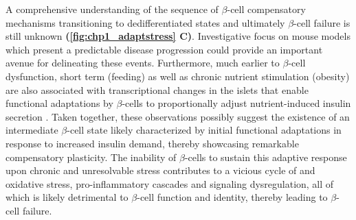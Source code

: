 A comprehensive understanding of the sequence of $\beta$-cell compensatory mechanisms transitioning to dedifferentiated states and ultimately $\beta$-cell failure is still unknown \textbf{(\autoref{fig:chp1_adaptstress} C)}. Investigative focus on mouse models which present a predictable disease progression could provide an important avenue for delineating these events. %
Furthermore, much earlier to $\beta$-cell dysfunction, short term (feeding) as well as chronic nutrient stimulation (obesity) are also associated with transcriptional changes in the islets that enable functional adaptations by $\beta$-cells to proportionally adjust nutrient-induced insulin secretion \textbf{\cite{wortham_nutrient_2023}}. Taken together, these observations possibly suggest the existence of an intermediate $\beta$-cell state likely characterized by initial functional adaptations in response to increased insulin demand, thereby showcasing remarkable compensatory plasticity. The inability of $\beta$-cells to sustain this adaptive response upon chronic and unresolvable stress contributes to a vicious cycle of  and oxidative stress, pro-inflammatory cascades and signaling dysregulation, all of which is likely detrimental to $\beta$-cell function and identity, thereby leading to $\beta$-cell failure.\\









